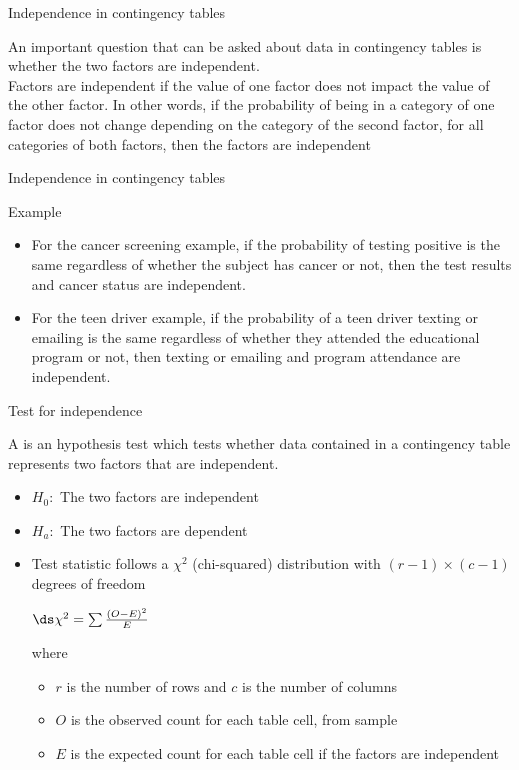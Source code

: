\documentclass[xcolor=table, handout]{beamer}
\begin{document}
\begin{frame}{Independence in contingency tables}
\begin{block}{}
\large
An important question that can be asked about data in contingency tables is whether the two factors are independent.\\
\pause\medskip
Factors are independent if the value of one factor does not impact the value of the other factor. In other words, if the probability of being in a category of one factor does not change depending on the category of the second factor, for all categories of both factors, then the factors are independent 
\end{block}
\end{frame}

\begin{frame}{Independence in contingency tables}
\begin{exampleblock}{Example}
\large
\begin{itemize}
\item For the cancer screening example, if the probability of testing positive is the same regardless of whether the subject has cancer or not, then the test results and cancer status are independent.

\pause\item For the teen driver example, if the probability of a teen driver texting or emailing is the same regardless of whether they attended the educational program or not, then texting or emailing and program attendance are independent.
\end{itemize}
\end{exampleblock}
\end{frame}

\begin{frame}{Test for independence}
\begin{block}{}
\large
A  is an hypothesis test which tests whether data contained in a contingency table represents two factors that are independent.
\begin{itemize}
\pause\item $H_0:$ The two factors are independent
\pause\item $H_a:$ The two factors are dependent\\
\pause\item Test statistic follows a $\chi^2$ (chi-squared) distribution with $(r-1) \times (c-1)$ degrees of freedom\\
\medskip
{\centering
$\ds \chi^2 = \sum \frac {(O-E)^2}{E}$
\par}
\medskip
where
\begin{itemize}
\item $r$ is the number of rows and $c$ is the number of columns
\item $O$ is the observed count for each table cell, from sample
\item $E$ is the expected count for each table cell if the factors are independent
\end{itemize}
\end{itemize}
\end{block}
\end{frame}
\end{document}
